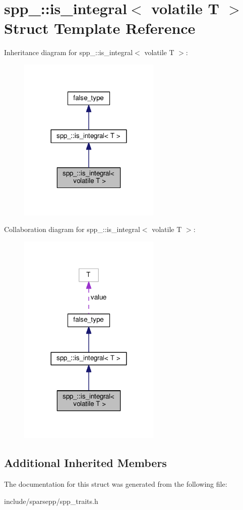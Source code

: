 \hypertarget{structspp___1_1is__integral_3_01volatile_01_t_01_4}{}\section{spp\+\_\+\+:\+:is\+\_\+integral$<$ volatile T $>$ Struct Template Reference}
\label{structspp___1_1is__integral_3_01volatile_01_t_01_4}


Inheritance diagram for spp\+\_\+\+:\+:is\+\_\+integral$<$ volatile T $>$\+:\nopagebreak
\begin{figure}[H]
\begin{center}
\leavevmode
\includegraphics[width=192pt]{structspp___1_1is__integral_3_01volatile_01_t_01_4__inherit__graph}
\end{center}
\end{figure}


Collaboration diagram for spp\+\_\+\+:\+:is\+\_\+integral$<$ volatile T $>$\+:\nopagebreak
\begin{figure}[H]
\begin{center}
\leavevmode
\includegraphics[width=192pt]{structspp___1_1is__integral_3_01volatile_01_t_01_4__coll__graph}
\end{center}
\end{figure}
\subsection*{Additional Inherited Members}


The documentation for this struct was generated from the following file\+:\begin{DoxyCompactItemize}
\item 
include/sparsepp/spp\+\_\+traits.\+h\end{DoxyCompactItemize}

